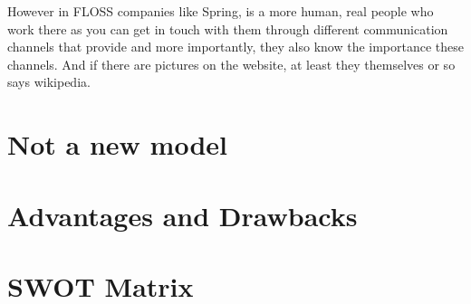 \documentclass[11pt]{scrartcl}
\begin{document}
\par However in FLOSS companies like Spring, is a more human, real people who work there as you can get in touch with them through different communication channels that provide and more importantly, they also know the importance these channels. And if there are pictures on the website, at least they themselves or so says wikipedia.


\section{Not a new model}



\section{Advantages and Drawbacks}

\section{SWOT Matrix}
\end{document}
